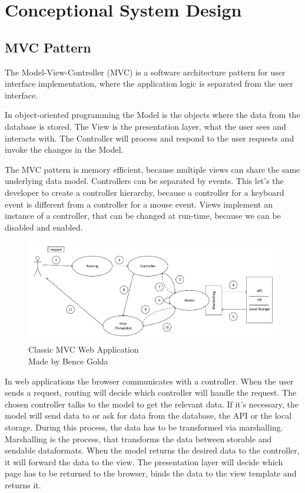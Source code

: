 \chapter{Conceptional System Design}


\section{MVC Pattern}
\label{mvc}

The Model-View-Controller (MVC) is a software architecture pattern for user interface implementation, where the application logic is separated from the user interface.

In object-oriented programming the Model is the objects where the data from the database is stored. The View is the presentation layer, what the user sees and interacts with. The Controller will process and respond to the user requests and invoke the changes in the Model. 

The MVC pattern is memory efficient, because multiple views can share the same underlying data model. Controllers can be separated by events. This let's the developer to create a controller hierarchy, because a controller for a keyboard event is different from a controller for a mouse event. Views implement an instance of a controller, that can be changed at run-time, because we can be disabled and enabled.


\begin{figure}[!ht]
	\includegraphics[width=\textwidth]{figures/klasszikus_mvc_webalkalmazas.pdf}
	\caption{Classic MVC Web Application \\ Made by Bence Golda}
	\label{fig:classic-mvc-webapplication}
\end{figure}

In web applications the browser communicates with a controller. When the user sends a request, routing will decide which controller will handle the request. The chosen controller talks to the model to get the relevant data. If it's necessary, the model will send data to or ask for data from the database, the API or the local storage. During this process, the data has to be transformed via marshalling. Marshalling is the process, that transforms the data between storable and sendable dataformats. When the model returns the desired data to the controller, it will forward the data to the view. The presentation layer will decide which page has to be returned to the browser, binds the data to the view template and returns it.

